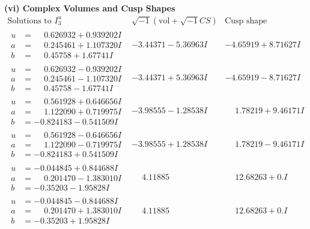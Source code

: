 \documentclass[1p]{elsarticle_modified}
\theoremstyle{definition}
\newcommand{\I}{\sqrt{-1}}
\begin{document}
\newpage\flushleft \textbf{(vi) Complex Volumes and Cusp Shapes}
$$\begin{array}{c|c|c}  
\text{Solutions to }I^u_{3}& \I (\text{vol} + \sqrt{-1}CS) & \text{Cusp shape}\\
 \hline 
\begin{aligned}
u &= \phantom{-}0.626932 + 0.939202 I \\
a &= \phantom{-}0.245461 + 1.107320 I \\
b &= \phantom{-}0.45758 + 1.67741 I\end{aligned}
 & -3.44371 - 5.36963 I & -4.65919 + 8.71627 I \\ \hline\begin{aligned}
u &= \phantom{-}0.626932 - 0.939202 I \\
a &= \phantom{-}0.245461 - 1.107320 I \\
b &= \phantom{-}0.45758 - 1.67741 I\end{aligned}
 & -3.44371 + 5.36963 I & -4.65919 - 8.71627 I \\ \hline\begin{aligned}
u &= \phantom{-}0.561928 + 0.646656 I \\
a &= \phantom{-}1.122090 + 0.719975 I \\
b &= -0.824183 - 0.541509 I\end{aligned}
 & -3.98555 - 1.28538 I & \phantom{-}1.78219 + 9.46171 I \\ \hline\begin{aligned}
u &= \phantom{-}0.561928 - 0.646656 I \\
a &= \phantom{-}1.122090 - 0.719975 I \\
b &= -0.824183 + 0.541509 I\end{aligned}
 & -3.98555 + 1.28538 I & \phantom{-}1.78219 - 9.46171 I \\ \hline\begin{aligned}
u &= -0.044845 + 0.844688 I \\
a &= \phantom{-}0.201470 - 1.383010 I \\
b &= -0.35203 - 1.95828 I\end{aligned}
 & \phantom{-}4.11885\phantom{ +0.000000I} & \phantom{-}12.68263 + 0. I\phantom{ +0.000000I} \\ \hline\begin{aligned}
u &= -0.044845 - 0.844688 I \\
a &= \phantom{-}0.201470 + 1.383010 I \\
b &= -0.35203 + 1.95828 I\end{aligned}
 & \phantom{-}4.11885\phantom{ +0.000000I} & \phantom{-}12.68263 + 0. I\phantom{ +0.000000I} \\ \hline\begin{aligned}

\end{aligned}
\end{array}$$
\end{document}
